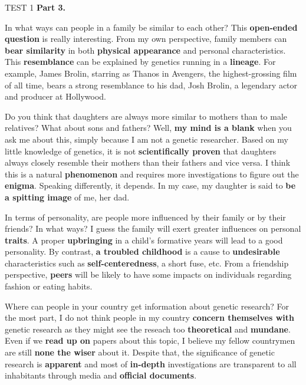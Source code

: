 \begin{glossarymc}[Cambridge 6]
\begin{test}{TEST 1}
    \noindent
    \textbf{Part 3.}
    \begin{qa}{In what ways can people in a family be similar to each other?}
    This \textbf{open-ended question} is really interesting. From my own perspective, family members can \textbf{bear similarity} in both \textbf{physical appearance} and personal characteristics. This \textbf{resemblance} can be explained by genetics running in a \textbf{lineage}. For example, James Brolin, starring as Thanos in Avengers, the highest-grossing film of all time, bears a strong resemblance to his dad, Josh Brolin, a legendary actor and producer at Hollywood.
    \end{qa}

    \begin{qa}{Do you think that daughters are always more similar to mothers than to male relatives? What about sons and fathers?}
    Well, \textbf{my mind is a blank} when you ask me about this, simply because I am not a genetic researcher. Based on my little knowledge of genetics, it is not \textbf{scientifically proven} that daughters always closely resemble their mothers than their fathers and vice versa. I think this is a natural \textbf{phenomenon} and requires more investigations to figure out the \textbf{enigma}. Speaking differently, it depends. In my case, my daughter is said to \textbf{be a spitting image} of me, her dad.
    \end{qa}

    \begin{qa}{In terms of personality, are people more influenced by their family or by their friends? In what ways?}
    I guess the family will exert greater influences on personal \textbf{traits}. A proper \textbf{upbringing} in a child's formative years will lead to a good personality. By contrast, \textbf{a troubled childhood} is a cause to \textbf{undesirable} characteristics such as \textbf{self-centeredness}, a short fuse, etc. From a friendship perspective, \textbf{peers} will be likely to have some impacts on individuals regarding fashion or eating habits.
    \end{qa}

    \begin{qa}{Where can people in your country get information about genetic research?}
    For the most part, I do not think people in my country \textbf{concern themselves with} genetic research as they might see the reseach too \textbf{theoretical} and \textbf{mundane}. Even if we \textbf{read up on} papers about this topic, I believe my fellow countrymen are still \textbf{none the wiser} about it. Despite that, the significance of genetic research is \textbf{apparent} and most of \textbf{in-depth} investigations are transparent to all inhabitants through media and \textbf{official documents}.
    \end{qa}


\end{test}
\end{glossarymc}
